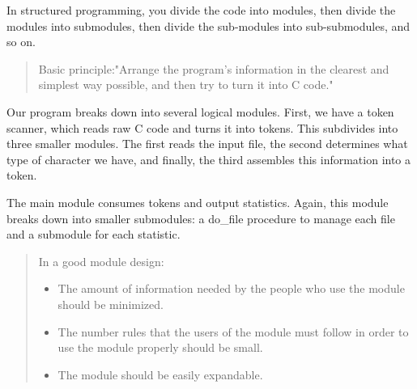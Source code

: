 \documentclass{report}
\begin{document}
In structured programming, you divide the code into modules, then divide the modules into submodules, then divide the sub-modules into sub-submodules,
and so on.

\begin{quote}
Basic principle:"Arrange the program's information in the clearest and simplest way possible, and then try to turn it into C code."
\end{quote}


Our program breaks down into several logical modules. First, we have a token scanner, which reads raw C code and turns it into tokens. This subdivides
into three smaller modules. The first reads the input file, the second determines what type of character we have, and finally, the third assembles this
information into a token.

The main module consumes tokens and output statistics. Again, this module breaks down into smaller submodules: a do_file procedure to manage each file
and a submodule for each statistic.

\begin{quote}
	In a good module design:
	\begin{itemize}
		\item
			The amount of information needed by the people who use the module should be minimized.
		\item
			The number rules that the users of the module must follow in order to use the module properly should be small.
		\item
			The module should be easily expandable.
	\end{itemize}
\end{quote}
\end{document}
